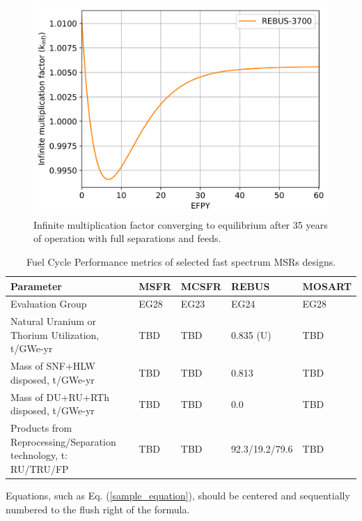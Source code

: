 \documentclass{anstrans}
\begin{document}
\begin{figure}[!htb]
  \centering
  \includegraphics[scale=0.585]{./Figures/k_inf.png}
  \caption{Infinite multiplication factor converging to equilibrium after 35 years of
operation with full separations and feeds.}   
  \label{fig:k_inf}
\end{figure}
\begin{table}[!htb]
  \centering
  \caption{Fuel Cycle Performance metrics of selected fast spectrum \glspl{MSR} designs.}
  \label{table:metrics} 
  \begin{tabular}{p{} p{} p{} p{} p{}} \toprule 
   Parameter & \gls{MSFR} & \gls{MCSFR} & REBUS & \gls{MOSART} \\ \midrule
   Evaluation Group	&  EG28 & EG23 & EG24 & EG28   \\ 
   Natural Uranium or Thorium Utilization, t/GWe-yr & TBD & TBD & 0.835 (U) & TBD \\
   Mass of \gls{SNF}+\gls{HLW} disposed, t/GWe-yr & TBD & TBD & 0.813 & TBD \\
   Mass of \gls{DU}+\gls{RU}+\gls{RTh} disposed, t/GWe-yr & TBD & TBD & 0.0 & TBD \\
   Products from Reprocessing/Separation technology, t: \gls{RU}/\gls{TRU}/\gls{FP} &
   TBD & TBD & 92.3/19.2/79.6 & TBD \\ \bottomrule 
  \end{tabular}
\end{table}


Equations, such as Eq. (\ref{sample_equation}), should be centered and 
sequentially numbered to the flush right of the formula.
\end{document}
